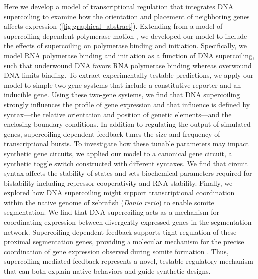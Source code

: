 \documentclass[11pt]{article}
\begin{document}
Here we develop a model of transcriptional regulation that integrates DNA supercoiling to examine how the orientation and placement of neighboring genes affects expression (\cref{fig:graphical_abstract}). Extending from a model of supercoiling-dependent polymerase motion \parencite{sevierPropertiesGeneExpression2018}, we developed our model to include the effects of supercoiling on polymerase binding and initiation. Specifically, we model RNA polymerase binding and initiation as a function of DNA supercoiling, such that underwound DNA favors RNA polymerase binding whereas overwound DNA limits binding. To extract experimentally testable predictions, we  apply our model to simple two-gene systems that include a constitutive reporter and an inducible gene. Using these two-gene systems, we find that DNA supercoiling strongly influences the profile of gene expression and that influence is defined by syntax---the relative orientation and position of genetic elements---and the enclosing boundary conditions. In addition to regulating the output of simulated genes, supercoiling-dependent feedback tunes the size and frequency of transcriptional bursts. To investigate how these tunable parameters may impact synthetic gene circuits, we applied our model to a canonical gene circuit, a synthetic toggle switch constructed with different syntaxes.
We find that circuit syntax affects the stability of states and sets biochemical parameters required for bistability including repressor cooperativity and RNA stability. Finally, we explored how DNA supercoiling might support transcriptional coordination within the native genome of zebrafish (\textit{Danio rerio}) to enable somite segmentation. We find that DNA supercoiling acts as a mechanism for coordinating expression between divergently expressed genes in the segmentation network. Supercoiling-dependent feedback supports tight regulation of these proximal segmentation genes, providing a molecular mechanism for the precise coordination of gene expression observed during somite formation \parencite{zinaniPairingSegmentationClock2021}. Thus, supercoiling-mediated feedback represents a novel, testable regulatory mechanism that can both explain native behaviors and guide synthetic designs.



\FloatBarrier
\end{document}
